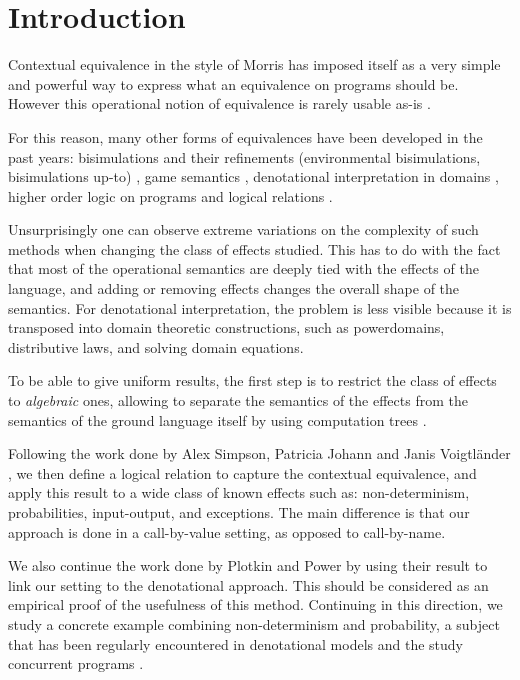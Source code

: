 \section{Introduction}

Contextual equivalence in the style of Morris
has imposed itself as a very simple and powerful
way to express what an equivalence on programs should be. 
However
this operational notion of equivalence is rarely usable 
as-is \cite{pitts1997operationally}.

For this reason, many other forms of equivalences have 
been developed in the past years: bisimulations 
and their refinements (environmental bisimulations, 
bisimulations up-to) \cite{koutavas2011applicative}, 
game semantics \cite{abramsky1999game}, 
denotational interpretation in domains \cite{scott1982domains}, 
higher order logic on 
programs \cite{honda2005observationally} 
and logical relations \cite{Pitts2000}.

Unsurprisingly one can observe extreme variations on 
the complexity of such methods when changing  
the class of effects studied. This has to do with 
the fact that most of the operational semantics 
are deeply tied with the effects of the language, 
and adding or removing effects changes the overall 
shape of the semantics. For denotational interpretation,
the problem is less visible because it is transposed 
into domain theoretic constructions, such as powerdomains, distributive laws,
and solving domain equations.

To be able to give uniform results, the first 
step is to restrict the class of effects
to \emph{algebraic} ones, 
allowing to separate the semantics 
of the effects from the semantics of the ground language
itself by using computation trees \cite{plotkin2001adequacy}.

Following the work done by Alex Simpson, Patricia
Johann and Janis Voigtländer \cite{gom}, we then define 
a logical relation to capture the contextual 
equivalence, and apply this result to a wide class of known effects 
such as: non-determinism, probabilities, input-output, and exceptions. 
The main difference is that our approach 
is done in a call-by-value setting, as opposed 
to call-by-name.


We also continue the work done by Plotkin and Power \cite{plotkin2001adequacy}
by using their result to link our setting to the denotational approach. This 
should be considered as an empirical proof of the usefulness of this method. 
Continuing in this direction, we study a concrete example combining
non-determinism and probability, a subject that has been regularly encountered 
in denotational models \cite{tix2009semantic} \cite{JGL-mscs16}
\cite{KeimelP2016} and the study concurrent programs
\cite{Mislove2000} \cite{mislove2004axioms}.
